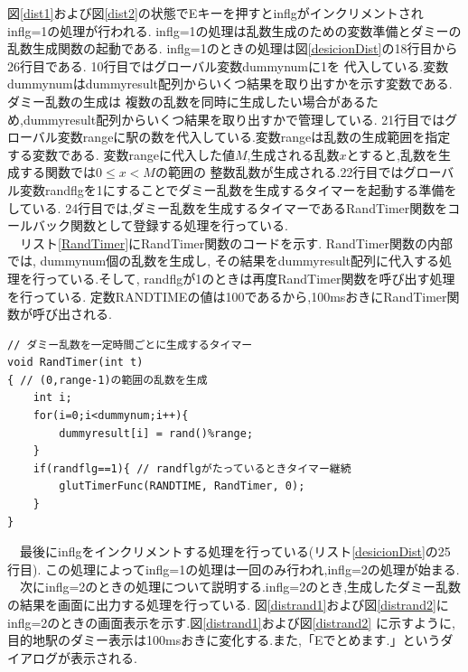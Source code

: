 \documentclass[a4j]{jarticle}
\begin{document}
        図\ref{dist1}および図\ref{dist2}の状態でEキーを押すとinflgがインクリメントされinflg=1の処理が行われる.
        inflg=1の処理は乱数生成のための変数準備とダミーの乱数生成関数の起動である.
        inflg=1のときの処理は図\ref{desicionDist}の18行目から26行目である. 10行目ではグローバル変数dummynumに1を
        代入している.変数dummynumはdummyresult配列からいくつ結果を取り出すかを示す変数である. ダミー乱数の生成は
        複数の乱数を同時に生成したい場合があるため,dummyresult配列からいくつ結果を取り出すかで管理している.
        21行目ではグローバル変数rangeに駅の数を代入している.変数rangeは乱数の生成範囲を指定する変数である.
        変数rangeに代入した値$M$,生成される乱数$x$とすると,乱数を生成する関数では$0 \leq x < M$の範囲の
        整数乱数が生成される.22行目ではグローバル変数randflgを1にすることでダミー乱数を生成するタイマーを起動する準備をしている.
        24行目では,ダミー乱数を生成するタイマーであるRandTimer関数をコールバック関数として登録する処理を行っている.\\
        　リスト\ref{RandTimer}にRandTimer関数のコードを示す. RandTimer関数の内部では, dummynum個の乱数を生成し,
        その結果をdummyresult配列に代入する処理を行っている.そして, randflgが1のときは再度RandTimer関数を呼び出す処理を行っている.
        定数RANDTIMEの値は100であるから,100msおきにRandTimer関数が呼び出される.
        \begin{lstlisting}[basicstyle=\ttfamily\footnotesize, frame=single,label=RandTimer,caption=RandTimer関数]
// ダミー乱数を一定時間ごとに生成するタイマー
void RandTimer(int t)
{ // (0,range-1)の範囲の乱数を生成
    int i;
    for(i=0;i<dummynum;i++){
        dummyresult[i] = rand()%range;
    }
    if(randflg==1){ // randflgがたっているときタイマー継続
        glutTimerFunc(RANDTIME, RandTimer, 0);
    }
}
        \end{lstlisting}
        　最後にinflgをインクリメントする処理を行っている(リスト\ref{desicionDist}の25行目).
        この処理によってinflg=1の処理は一回のみ行われ,inflg=2の処理が始まる.\\
        　次にinflg=2のときの処理について説明する.inflg=2のとき,生成したダミー乱数の結果を画面に出力する処理を行っている.
        図\ref{distrand1}および図\ref{distrand2}にinflg=2のときの画面表示を示す.図\ref{distrand1}および図\ref{distrand2}
        に示すように,目的地駅のダミー表示は100msおきに変化する.また,「Eでとめます.」というダイアログが表示される.
\end{document}
